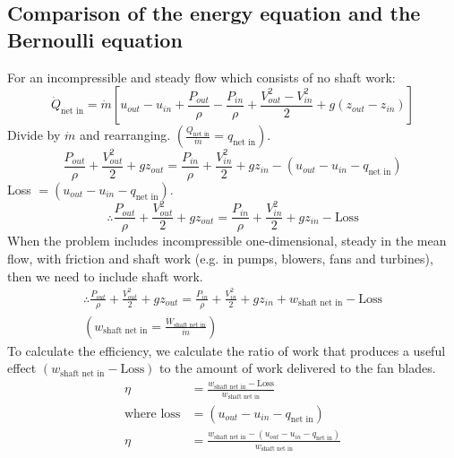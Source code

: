 \documentclass[class=report, crop=false, 12pt,a4paper]{standalone}
\begin{document}
\subsection{Comparison of the energy equation and the \\ Bernoulli equation}
For an incompressible and steady flow which consists of no shaft work:
\begin{equation}
  \dot{Q}_{\textrm{net in}} = \dot{m} \left[ u_{out} - u_{in} + \frac{P_{out}}{\rho} - \frac{P_{in}}{\rho} + \frac{V_{out}^2 - V_{in}^2}{2} + g(z_{out} - z_{in}) \right]
\end{equation}
Divide by $\dot{m}$ and rearranging. $(\frac{Q_{\textrm{net in}}}{\dot{m}} = q_{\textrm{net in}})$.
\begin{equation}
  \frac{P_{out}}{\rho} + \frac{V_{out}^2}{2} + gz_{out} = \frac{P_{in}}{\rho} + \frac{V_{in}^2}{2} + gz_{in} - (u_{out} - u_{in} - q_{\textrm{net in}})
\end{equation}
Loss $= (u_{out} - u_{in} - q_{\textrm{net in}})$.
\begin{equation}
  \therefore \frac{P_{out}}{\rho} + \frac{V_{out}^2}{2} + gz_{out} = \frac{P_{in}}{\rho} + \frac{V_{in}^2}{2} + gz_{in} - \textrm{Loss}
\end{equation}
When the problem includes incompressible one-dimensional, steady in the mean flow, with friction and shaft work (e.g. in pumps, blowers, fans and turbines), then we need to include shaft work.
\begin{gather}
  \therefore \frac{P_{out}}{\rho} + \frac{V_{out}^2}{2} + gz_{out} = \frac{P_{in}}{\rho} + \frac{V_{in}^2}{2} + gz_{in} + w_{\textrm{shaft net in}} - \textrm{Loss}\\
  (w_{\textrm{shaft net in}} = \frac{\dot{W}_{\textrm{shaft net in}}}{\dot{m}})
\end{gather}
To calculate the efficiency, we calculate the ratio of work that produces a useful effect $(w_{\textrm{shaft net in}} - \textrm{Loss})$ to the amount of work delivered to the fan blades.
\begin{align}
  \eta &= \frac{w_{\textrm{shaft net in}} - \textrm{Loss}}{w_{\textrm{shaft net in}}}\\
  \textrm{where loss} &= (u_{out} - u_{in} - q_{\textrm{net in}})\\
  \eta &= \frac{w_{\textrm{shaft net in}} - (u_{out} - u_{in} - q_{\textrm{net in}})}{w_{\textrm{shaft net in}}}
\end{align}
\end{document}
